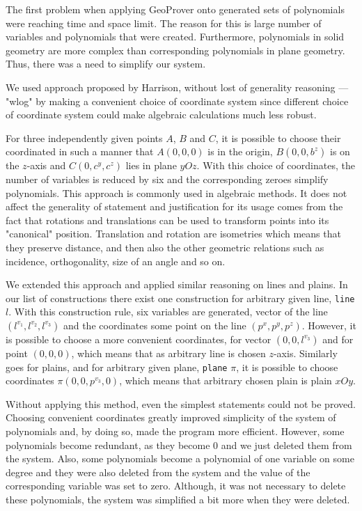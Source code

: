 \documentclass[final,1p,times,authoryear]{elsarticle}
\begin{document}
The first problem when applying GeoProver onto generated sets of
polynomials were reaching time and space limit. The reason for this is
large number of variables and polynomials that were
created. Furthermore, polynomials in solid geometry are more complex
than corresponding polynomials in plane geometry. Thus, there was a
need to simplify our system.

We used approach proposed by Harrison, without lost of generality
reasoning --- "wlog" \cite{harrison} by making a convenient choice of
coordinate system since different choice of coordinate system could
make algebraic calculations much less robust. 

For three independently given points $A$, $B$ and $C$, it is possible
to choose their coordinated in such a manner that $A(0, 0, 0)$ is in
the origin, $B(0, 0, b^z)$ is on the $z$-axis and $C(0, c^y, c^z)$
lies in plane $yOz$. With this choice of coordinates, the number of
variables is reduced by six and the corresponding zeroes simplify
polynomials. This approach is commonly used in algebraic methods. It
does not affect the generality of statement and justification for its
usage comes from the fact that rotations and translations can be used
to transform points into its "canonical" position. Translation and
rotation are isometries which means that they preserve distance, and
then also the other geometric relations such as incidence,
orthogonality, size of an angle and so on.

We extended this approach and applied similar reasoning on lines and
plains. In our list of constructions there exist one construction for
arbitrary given line, {\tt line} $l$. With this construction rule, six
variables are generated, vector of the line $(l^{v_1}, l^{v_2},
l^{v_3})$ and the coordinates some point on the line $(p^x, p^y,
p^z)$. However, it is possible to choose a more convenient
coordinates, for vector $(0, 0, l^{v_3})$ and for point $(0, 0, 0)$,
which means that as arbitrary line is chosen $z$-axis. Similarly goes
for plains, and for arbitrary given plane, {\tt plane} $\pi$, it is
possible to choose coordinates $\pi (0, 0, p^{v_3}, 0)$, which means
that arbitrary chosen plain is plain $xOy$.

Without applying this method, even the simplest statements could not
be proved. Choosing convenient coordinates greatly improved simplicity
of the system of polynomials and, by doing so, made the program more
efficient. However, some polynomials become redundant, as they become
$0$ and we just deleted them from the system. Also, some polynomials
become a polynomial of one variable on some degree and they were also
deleted from the system and the value of the corresponding variable
was set to zero. Although, it was not necessary to delete these
polynomials, the system was simplified a bit more when they were
deleted.
\end{document}
